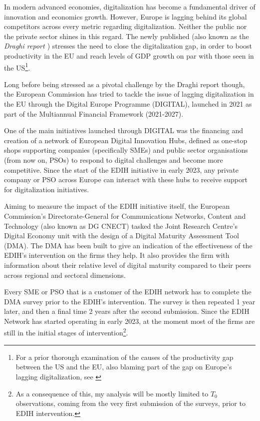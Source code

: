 \documentclass[12pt]{report}
\begin{document}
\par In modern advanced economies, digitalization has become a fundamental driver of innovation and economics growth. However, Europe is lagging behind its global competitors across every metric regarding digitalization. Neither the public nor the private sector shines in this regard. The newly published  (also known as the \textit{Draghi report \cite{draghi2024}}) stresses the need to close the digitalization gap, in order to boost productivity in the EU and reach levels of GDP growth on par with those seen in the US\footnote{For a prior thorough examination of the causes of the productivity gap between the US and the EU, also blaming part of the gap on Europe's lagging digitalization, see \cite{vanArk2008}}.
\par Long before being stressed as a pivotal challenge by the Draghi report though, the European Commission has tried to tackle the issue of lagging digitalization in the EU through the Digital Europe Programme (DIGITAL), launched in 2021 as part of the Multiannual Financial Framework (2021-2027).
\par One of the main initiatives launched through DIGITAL was the financing and creation of a network of European Digital Innovation Hubs, defined as one-stop shops supporting companies (specifically SMEs) and public sector organisations (from now on, PSOs) to respond to digital challenges and become more competitive. Since the start of the EDIH initiative in early 2023, any private company or PSO across Europe can interact with these hubs to receive support for digitalization initiatives.
\par Aiming to measure the impact of the EDIH initiative itself, the European Commission's Directorate-General for Communications Networks, Content and Technology (also known as DG CNECT) tasked the Joint Research Centre's Digital Economy unit with the design of a Digital Maturity Assessment Tool (DMA). The DMA has been built to give an indication of the effectiveness of the EDIH's intervention on the firms they help. It also provides the firm with information about their relative level of digital maturity compared to their peers across regional and sectoral dimensions.
\par Every SME or PSO that is a customer of the EDIH network has to complete the DMA survey prior to the EDIH's intervention. The survey is then repeated 1 year later, and then a final time 2 years after the second submission. Since the EDIH Network has started operating in early 2023, at the moment most of the firms are still in the initial stages of intervention\footnote{As a consequence of this, my analysis will be mostly limited to $T_0$ observations, coming from the very first submission of the surveys, prior to EDIH intervention.}.
\end{document}
